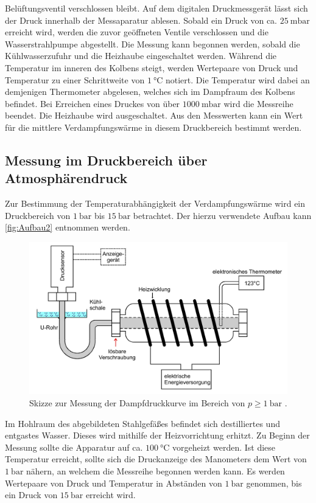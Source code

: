 Belüftungsventil verschlossen bleibt. Auf dem digitalen Druckmessgerät lässt sich der Druck innerhalb der Messaparatur ablesen. Sobald ein Druck von
ca. $\qty{25}{\milli\bar}$ erreicht wird, werden die zuvor geöffneten Ventile verschlossen und die Wasserstrahlpumpe abgestellt. Die Messung kann begonnen werden,
sobald die Kühlwasserzufuhr und die Heizhaube eingeschaltet werden. Während die Temperatur im inneren des Kolbens steigt, werden Wertepaare von Druck und 
Temperatur zu einer Schrittweite von $\qty{1}{\degreeCelsius}$ notiert. Die Temperatur wird dabei an demjenigen Thermometer abgelesen, welches sich im Dampfraum des 
Kolbens befindet. Bei Erreichen eines Druckes von über $\qty{1000}{\milli\bar}$ wird die Messreihe beendet. Die Heizhaube wird ausgeschaltet. Aus den Messwerten kann
ein Wert für die mittlere Verdampfungswärme in diesem Druckbereich bestimmt werden.

\subsection{Messung im Druckbereich über Atmosphärendruck}
\label{subsec:D_Überdruck}
Zur Bestimmung der Temperaturabhängigkeit der Verdampfungswärme wird ein Druckbereich von $\qty{1}{\bar}$ bis $\qty{15}{\bar}$ betrachtet. Der hierzu verwendete Aufbau
kann \autoref{fig:Aufbau2} entnommen werden.

\begin{figure}
    \centering
    \includegraphics[width =.75\textwidth]{content/Aufbau2.jpg}
    \caption{Skizze zur Messung der Dampfdruckkurve im Bereich von $p \geq \qty{1}{\bar}$ \cite{v203}.}
    \label{fig:Aufbau2}
\end{figure}

Im Hohlraum des abgebildeten Stahlgefäßes befindet sich destilliertes und entgastes Wasser. Dieses wird mithilfe der Heizvorrichtung erhitzt. Zu Beginn der Messung 
sollte die Apparatur auf ca. $\qty{100}{\degreeCelsius}$ vorgeheizt werden. Ist diese Temperatur erreicht, sollte sich die Druckanzeige des Manometers dem Wert von
$\qty{1}{\bar}$ nähern, an welchem die Messreihe begonnen werden kann. Es werden Wertepaare von Druck und Temperatur in Abständen von $\qty{1}{\bar}$ genommen, bis ein 
Druck von $\qty{15}{\bar}$ erreicht wird. 
